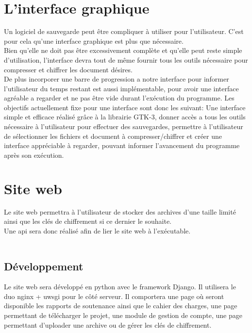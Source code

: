         
    
\newpage

\section{L'interface graphique}
    Un logiciel de sauvegarde peut être compliquer à utiliser pour l'utilisateur. C'est pour cela qu'une interface graphique est plus que nécessaire. \\
    Bien qu'elle ne doit pas être excessivement complète et qu'elle peut reste simple d'utilisation, l'interface devra tout de même fournir tous les outils nécessaire pour compresser et chiffrer les document désires. \\
    De plus incorporer une barre de progression a notre interface pour informer l'utilisateur du temps restant est aussi implémentable, pour avoir une interface agréable a regarder et ne pas être vide durant l'exécution du programme. Les objectifs actuellement fixe pour une interface sont donc les suivant: Une interface simple et efficace réalisé grâce à la librairie GTK-3, donner accès a tous les outils nécessaire à l'utilisateur pour effectuer des sauvegardes, permettre à l'utilisateur de sélectionner les fichiers et document à compresser/chiffrer et créer une interface appréciable à regarder, pouvant informer l'avancement du programme après son exécution. 
        
\newpage

\section{Site web}

    Le site web permettra à l'utilisateur de stocker des archives d'une taille limité ainsi que les clés de chiffrement si ce dernier le souhaite. \\
    Une api sera donc réalisé afin de lier le site web à l'exécutable. \\ \\
    
    \subsection{Développement}
        Le site web sera développé en python avec le framework Django. Il utilisera le duo nginx + uwsgi pour le côté serveur.
        Il comportera une page où seront disponible les rapports de soutenance ainsi que le cahier des charges, une page permettant de télécharger le projet, une module de gestion de compte, une page permettant d'uploader une archive ou de gérer les clés de chiffrement.
        
